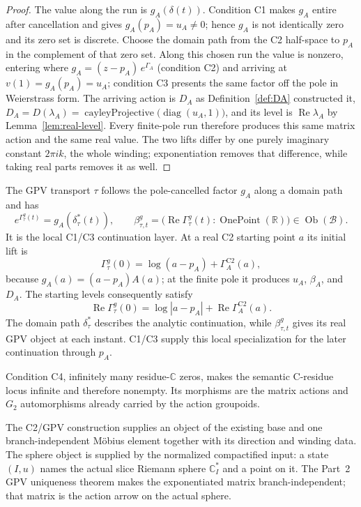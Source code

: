 \documentclass[11pt]{article}
\newcommand{\CC}{\mathbb{C}}
\newcommand{\RR}{\mathbb{R}}
\theoremstyle{plain}
\theoremstyle{definition}
\theoremstyle{remark}
\begin{document}
\begin{proof}
The value along the run is $g_A(\delta(t))$. Condition \textup{C1} makes
$g_A$ entire after cancellation and gives $g_A(p_A)=u_A\ne0$; hence $g_A$
is not identically zero and its zero set is discrete. Choose the domain path
from the C2 half-space to $p_A$ in the complement of that zero set. Along
this chosen run the value is nonzero, entering where
$g_A=(z-p_A)\,e^{\Gamma_A}$ (condition \textup{C2}) and arriving at
$v(1)=g_A(p_A)=u_A$; condition \textup{C3} presents the same factor off the
pole in Weierstrass form. The arriving action is $D_A$ as
Definition~\ref{def:DA} constructed it,
$D_A=D(\lambda_A)=\operatorname{cayleyProjective}\bigl(\operatorname{diag}(u_A,1)\bigr)$,
and its level is $\operatorname{Re}\lambda_A$ by
Lemma~\ref{lem:real-level}. Every finite-pole run therefore produces this
same matrix action and the same real value.  The two lifts differ by one
purely imaginary constant $2\pi ik$, the whole winding; exponentiation
removes that difference, while taking real parts removes it as well.
\end{proof}

The GPV transport $\tau$ follows the pole-cancelled factor $g_A$ along a
domain path and has
\[
 e^{\Gamma^g_\tau(t)}=g_A(\delta_\tau^*(t)),\qquad
 \beta^g_{\tau,t}=
 \bigl(\operatorname{Re}\Gamma^g_\tau(t):
       \operatorname{OnePoint}(\RR)\bigr)
 \in\operatorname{Ob}(\mathcal B).
\]
It is the local C1/C3 continuation layer. At a real C2 starting point $a$
its initial lift is
\[
 \Gamma^g_\tau(0)=\log(a-p_A)+\Gamma_A^{\mathrm{C2}}(a),
\]
because $g_A(a)=(a-p_A)A(a)$; at the finite pole it produces $u_A$,
$\beta_A$, and $D_A$. The starting levels consequently satisfy
\[
 \operatorname{Re}\Gamma^g_\tau(0)
   =\log|a-p_A|+\operatorname{Re}\Gamma_A^{\mathrm{C2}}(a).
\]
The domain path $\delta_\tau^*$ describes the analytic continuation, while
$\beta^g_{\tau,t}$ gives its real GPV object at each instant. C1/C3 supply
this local specialization for the later continuation through $p_A$.

Condition \textup{C4}, infinitely many residue-$\CC$ zeros, makes the
semantic C-residue locus infinite and therefore nonempty. Its morphisms are
the matrix actions and $G_2$ automorphisms already carried by the action
groupoids.

The C2/GPV construction supplies an object of the existing base and one
branch-independent Möbius element together with its direction and winding
data. The sphere object is supplied by the normalized compactified input: a
state $(I,u)$ names the actual slice Riemann sphere $\CC_I^{*}$ and a point
on it. The Part~2 GPV uniqueness theorem makes the exponentiated matrix
branch-independent; that matrix is the action arrow on the actual sphere.
\end{document}
